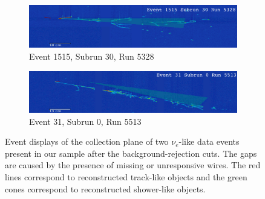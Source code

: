 \begin{figure}[htbp]
\centering
  \begin{subfigure}{0.7\textwidth}
  \includegraphics[width=\linewidth]{figures/data1.png}
    \caption{Event 1515, Subrun 30, Run 5328}
\end{subfigure}
  \begin{subfigure}{0.7\textwidth}	
  \includegraphics[width=\linewidth]{figures/data2.png}
  \caption{Event 31, Subrun 0, Run 5513}
\end{subfigure}

  \caption{Event displays of the collection plane of two $\nu_{e}$-like data events present in our sample after the background-rejection cuts. The gaps are caused by the presence of missing or unresponsive wires. The red lines correspond to reconstructed track-like objects and the green cones correspond to reconstructed shower-like objects. }
  \label{fig:evds}
\end{figure}